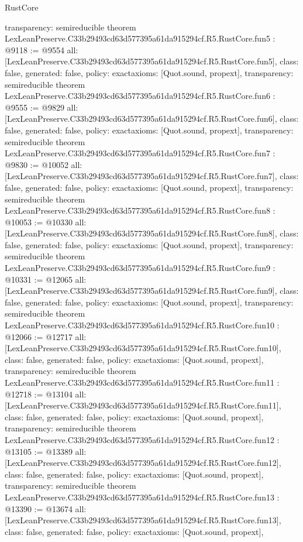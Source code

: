 \begin{lexlean}{RustCore}
\begin{coremodule}
{  transparency: semireducible
}
theorem LexLeanPreserve.C33b29493cd63d577395a61da915294cf.R5.RustCore.fun5 : @9118 := @9554 {
  all: [LexLeanPreserve.C33b29493cd63d577395a61da915294cf.R5.RustCore.fun5],
  class: false,
  generated: false,
  policy: exact{axioms: [Quot.sound, propext]},
  transparency: semireducible
}
theorem LexLeanPreserve.C33b29493cd63d577395a61da915294cf.R5.RustCore.fun6 : @9555 := @9829 {
  all: [LexLeanPreserve.C33b29493cd63d577395a61da915294cf.R5.RustCore.fun6],
  class: false,
  generated: false,
  policy: exact{axioms: [Quot.sound, propext]},
  transparency: semireducible
}
theorem LexLeanPreserve.C33b29493cd63d577395a61da915294cf.R5.RustCore.fun7 : @9830 := @10052 {
  all: [LexLeanPreserve.C33b29493cd63d577395a61da915294cf.R5.RustCore.fun7],
  class: false,
  generated: false,
  policy: exact{axioms: [Quot.sound, propext]},
  transparency: semireducible
}
theorem LexLeanPreserve.C33b29493cd63d577395a61da915294cf.R5.RustCore.fun8 : @10053 := @10330 {
  all: [LexLeanPreserve.C33b29493cd63d577395a61da915294cf.R5.RustCore.fun8],
  class: false,
  generated: false,
  policy: exact{axioms: [Quot.sound, propext]},
  transparency: semireducible
}
theorem LexLeanPreserve.C33b29493cd63d577395a61da915294cf.R5.RustCore.fun9 : @10331 := @12065 {
  all: [LexLeanPreserve.C33b29493cd63d577395a61da915294cf.R5.RustCore.fun9],
  class: false,
  generated: false,
  policy: exact{axioms: [Quot.sound, propext]},
  transparency: semireducible
}
theorem LexLeanPreserve.C33b29493cd63d577395a61da915294cf.R5.RustCore.fun10 : @12066 := @12717 {
  all: [LexLeanPreserve.C33b29493cd63d577395a61da915294cf.R5.RustCore.fun10],
  class: false,
  generated: false,
  policy: exact{axioms: [Quot.sound, propext]},
  transparency: semireducible
}
theorem LexLeanPreserve.C33b29493cd63d577395a61da915294cf.R5.RustCore.fun11 : @12718 := @13104 {
  all: [LexLeanPreserve.C33b29493cd63d577395a61da915294cf.R5.RustCore.fun11],
  class: false,
  generated: false,
  policy: exact{axioms: [Quot.sound, propext]},
  transparency: semireducible
}
theorem LexLeanPreserve.C33b29493cd63d577395a61da915294cf.R5.RustCore.fun12 : @13105 := @13389 {
  all: [LexLeanPreserve.C33b29493cd63d577395a61da915294cf.R5.RustCore.fun12],
  class: false,
  generated: false,
  policy: exact{axioms: [Quot.sound, propext]},
  transparency: semireducible
}
theorem LexLeanPreserve.C33b29493cd63d577395a61da915294cf.R5.RustCore.fun13 : @13390 := @13674 {
  all: [LexLeanPreserve.C33b29493cd63d577395a61da915294cf.R5.RustCore.fun13],
  class: false,
  generated: false,
  policy: exact{axioms: [Quot.sound, propext]},
}
\end{coremodule}
\end{lexlean}
